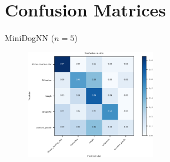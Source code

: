 

  \section{Confusion Matrices}

  \begin{frame}[noframenumbering]
    \tableofcontents[currentsection]
  \end{frame}

  \begin{frame}{MiniDogNN ($n = 5$)}
    \begin{figure}
      \centering
      \includegraphics[width=0.5\textwidth]{logos/MiniDogNN/confusion_matrix_mini.pdf}
      \label{fig:cm_mini}
    \end{figure}
  \end{frame}

